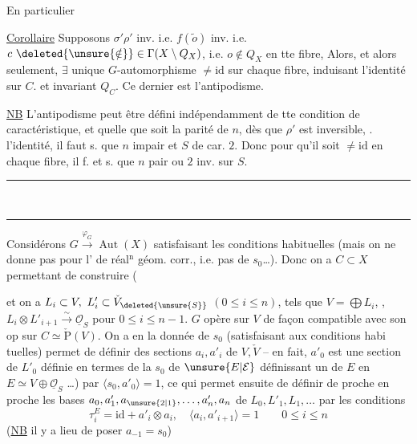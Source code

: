 En particulier

\uline{Corollaire} Supposons $\sigma'\rho'$ inv. i.e. $f(\widetilde o)$ inv. i.e. $c\ \deleted{\unsure{\notin}}\in\Gamma(X\setminus Q_X)$,  i.e. $o\notin Q_X$ en tte fibre,  Alors, et alors seulement,  $\exists$ unique $G$-automorphisme $\ne\mathrm{id}$ sur chaque fibre, induisant l'identité sur $C$. et invariant $Q_C$. Ce dernier est l'antipodisme.

\uline{NB} L'antipodisme peut être défini  indépendamment de tte condition de caractéristique, et quelle que soit la parité de $n$, dès que $\rho'$ est inversible, .   l'identité, il faut s. que $n$ impair et $S$ de car. $2$. Donc pour qu'il soit $\ne\mathrm{id}$ en chaque fibre, il f. et s. que $n$ pair ou $2$ inv. sur $S$.

\begin{center}\rule{1.1cm}{0.4pt}\\[-.6ex]\rule{.9cm}{0.4pt}\end{center}

Considérons $G\xrightarrow{\varphi_G}\operatorname{Aut}(X)$ satisfaisant les conditions habituelles (mais on ne donne pas pour l' de réal$^{\mathrm n}$ géom. corr., i.e. pas de $s_0$\ldots). Donc on a $C\subset X$ permettant de construire (

et on a $L_i\subset V,\ L'_i\subset\check V_{\deleted{\unsure{S}}}$ $(0\leq i\leq n)$,  tels que $V=\bigoplus L_i$, , $L_i\otimes L'_{i+1}\overset{\sim}{\longrightarrow}\underline{\mathcal O}_S$ pour $0\leq i\leq n-1$.   $G$ opère sur $V$  de façon compatible avec son op sur $C\simeq\check{\mathrm P}(V)$. On a en  la donnée de $s_0$ (satisfaisant aux conditions habi%
%
tuelles) permet de définir des sections $a_i,a'_i$ de $V,\check V$ -- en fait, $a'_0$ est une section de $L'_0$ définie en termes de  la   $s_0$ de $\unsure{E|\mathcal E}$   définissant un  de $E$ en $E\simeq V\oplus\underline{\mathcal O}_S$ \ldots) par $\langle s_0,a'_0\rangle=1$, ce qui permet ensuite de définir de proche en proche les bases $a_0,a'_1,a_{\unsure{2|1}},\ldots,a'_n,a_n$ de $L_0,L'_1,L_1,\ldots$ par les conditions
\[
\tau_i^E=\mathrm{id}+a'_i\otimes a_i,\quad
\langle a_i,a'_{i+1}\rangle=1\qquad 0\leq i\leq n
\]
(\uline{NB} il y a lieu de poser $a_{-1}=s_0$)

